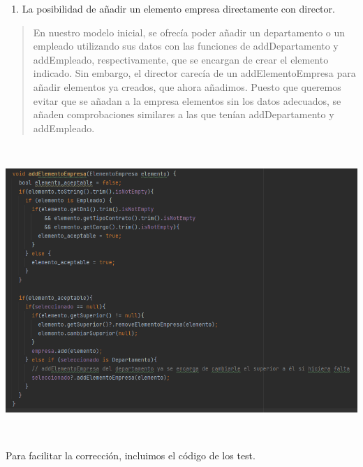 \documentclass[openany]{article}
\begin{document}
\begin{enumerate}
\def\labelenumi{\arabic{enumi}.}
\setcounter{enumi}{4}
\item
  La posibilidad de añadir un elemento empresa directamente con
  director.
\end{enumerate}

\begin{quote}
En nuestro modelo inicial, se ofrecía poder añadir un departamento o un
empleado utilizando sus datos con las funciones de addDepartamento y
addEmpleado, respectivamente, que se encargan de crear el elemento
indicado. Sin embargo, el director carecía de un addElementoEmpresa para
añadir elementos ya creados, que ahora añadimos. Puesto que queremos
evitar que se añadan a la empresa elementos sin los datos adecuados, se
añaden comprobaciones similares a las que tenían addDepartamento y
addEmpleado.
\end{quote}

\includegraphics[width=6.26772in,height=4.33333in]{imagenes/addElementoEmpresa.png}

\pagebreak

Para facilitar la corrección, incluimos el código de los test.
\end{document}
